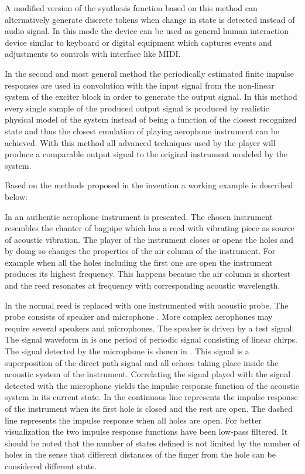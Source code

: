 \pa
A modified version of the synthesis function based on this method can alternatively generate discrete tokens when change in state is detected instead of audio signal. In this mode the device can be used as general human interaction device similar to keyboard or digital equipment which captures events and adjustments to controls with interface like MIDI.

\pa
In the second and most general method the periodically estimated finite impulse responses are used in convolution with the input signal from the non-linear system of the exciter block in order to generate the output signal. In this method every single sample of the produced output signal is produced by realistic physical model of the system instead of being a function of the closest recognized state and thus the closest emulation of playing aerophone instrument can be achieved. With this method all advanced techniques used by the player will produce a comparable output signal to the original instrument modeled by the system.

\pa
Based on the methods proposed in the invention a working example is described below:

\pa
In  an authentic aerophone instrument is presented. The chosen instrument resembles the chanter  of bagpipe which has a reed  with vibrating piece  as source of acoustic vibration. The player of the instrument closes or opens the holes and by doing so changes the properties of the air column of the instrument. For example when all the holes including the first one  are open the instrument produces its highest frequency. This happens because the air column is shortest and the reed resonates at frequency with corresponding acoustic wavelength.

\pa
In  the normal reed is replaced with one instrumented with acoustic probe. The probe consists of speaker  and microphone . More complex aerophones may require several speakers and microphones. The speaker is driven by a test signal. The signal waveform in  is one period of periodic signal consisting of linear chirps. The signal detected by the microphone is shown in . This signal is a superposition of the direct path signal and all echoes taking place inside the acoustic system of the instrument. Correlating the signal played with the signal detected with the microphone yields the impulse response function of the acoustic system in its current state. In  the continuous line represents the impulse response of the instrument when its first hole  is closed and the rest are open. The dashed line represents the impulse response when all holes are open. For better visualization the two impulse response functions have been low-pass filtered. It should be noted that the number of states defined is not limited by the number of holes in the sense that different distances of the finger from the hole can be considered different state.

